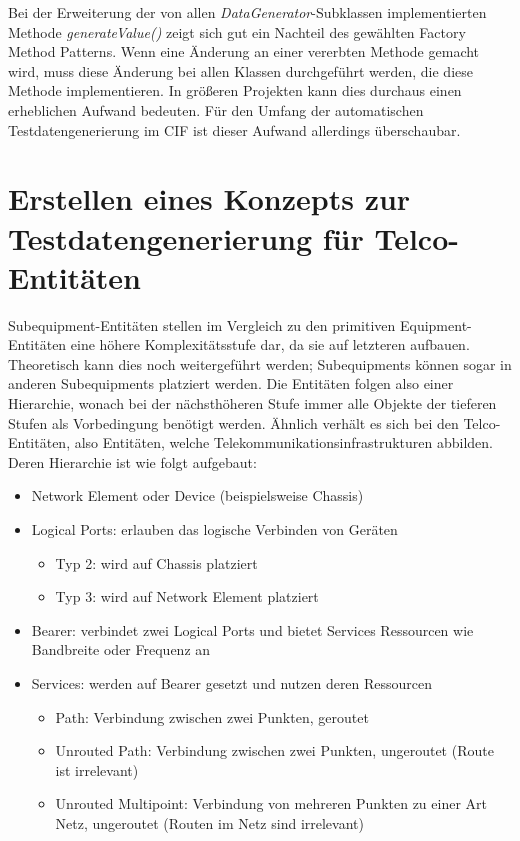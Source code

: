 Bei der Erweiterung der von allen \textit{DataGenerator}-Subklassen implementierten Methode \textit{generateValue()} zeigt sich gut ein Nachteil des gewählten Factory Method Patterns. Wenn eine Änderung an einer vererbten Methode gemacht wird, muss diese Änderung bei allen Klassen durchgeführt werden, die diese Methode implementieren. In größeren Projekten kann dies durchaus einen erheblichen Aufwand bedeuten. Für den Umfang der automatischen Testdatengenerierung im \ac{CIF} ist dieser Aufwand allerdings überschaubar.

\section{Erstellen eines Konzepts zur Testdatengenerierung für Telco-Entitäten}\label{sec:tdgtelco}
Subequipment-Entitäten stellen im Vergleich zu den primitiven Equipment-Entitäten eine höhere Komplexitätsstufe dar, da sie auf letzteren aufbauen. Theoretisch kann dies noch weitergeführt werden; Subequipments können sogar in anderen Subequipments platziert werden. Die Entitäten folgen also einer Hierarchie, wonach bei der nächsthöheren Stufe immer alle Objekte der tieferen Stufen als Vorbedingung benötigt werden. Ähnlich verhält es sich bei den Telco-Entitäten, also Entitäten, welche Telekommunikationsinfrastrukturen abbilden. Deren Hierarchie ist wie folgt aufgebaut:

\begin{itemize}
    \item Network Element oder Device (beispielsweise Chassis)
    \item Logical Ports: erlauben das logische Verbinden von Geräten
    \begin{itemize}
        \item Typ 2: wird auf Chassis platziert
        \item Typ 3: wird auf Network Element platziert
    \end{itemize}
    \item Bearer: verbindet zwei Logical Ports und bietet Services Ressourcen wie Bandbreite oder Frequenz an
    \item Services: werden auf Bearer gesetzt und nutzen deren Ressourcen
    \begin{itemize}
        \item Path: Verbindung zwischen zwei Punkten, geroutet
        \item Unrouted Path: Verbindung zwischen zwei Punkten, ungeroutet (Route ist irrelevant)
        \item Unrouted Multipoint: Verbindung von mehreren Punkten zu einer Art Netz, ungeroutet (Routen im Netz sind irrelevant)
    \end{itemize}
\end{itemize}


